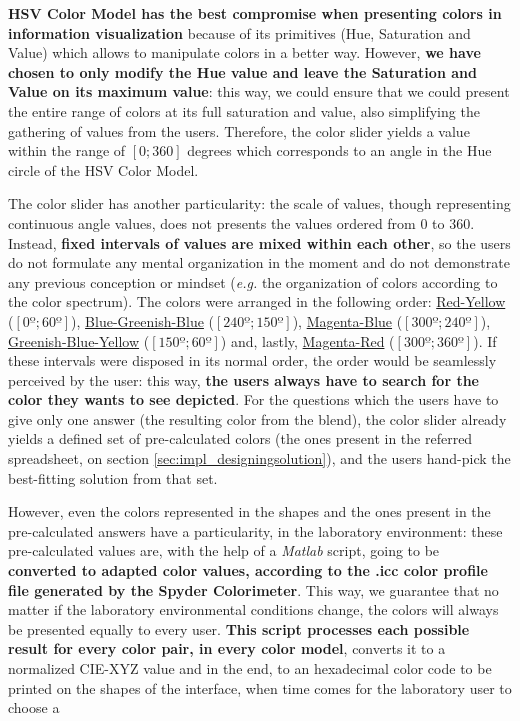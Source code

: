 \textbf{HSV Color Model has the best compromise when presenting colors in information visualization} because of its primitives (Hue, Saturation and Value)
which allows to manipulate colors in a better way. However, \textbf{we have chosen to only modify the Hue value and leave the Saturation and Value on its
maximum value}: this way, we could ensure that we could present the entire range of colors at its full saturation and value, also simplifying the gathering
of values from the users. Therefore, the color slider yields a value within the range of $[0 ; 360]$ degrees which corresponds to an angle in the Hue circle
of the HSV Color Model. \par
%
The color slider has another particularity: the scale of values, though representing continuous angle values, does not presents the values ordered from 0 to 360.
Instead, \textbf{fixed intervals of values are mixed within each other}, so the users do not formulate any mental organization in the moment and do not demonstrate any previous conception or mindset
(\emph{e.g.} the organization of colors according to the color spectrum). The colors were arranged in the following order: \ul{Red-Yellow} ($[0º; 60º]$),
\ul{Blue-Greenish-Blue} ($[240º; 150º]$), \ul{Magenta-Blue} ($[300º; 240º]$), \ul{Greenish-Blue-Yellow} ($[150º; 60º]$) and, lastly, \ul{Magenta-Red} ($[300º; 360º]$). If these
intervals were disposed in its normal order, the order would be seamlessly perceived by the user: this way, \textbf{the users always have to search for the
color they wants to see depicted}. For the questions which the users have to give only one answer (the resulting color from the blend), the color slider
already yields a defined set of pre-calculated colors (the ones present in the referred spreadsheet, on section \ref{sec:impl_designingsolution}), and the
users hand-pick the best-fitting solution from that set. \par
%
However, even the colors represented in the shapes and the ones present in the pre-calculated answers have a particularity, in the laboratory environment: these
pre-calculated values are, with the help of a \emph{Matlab} script, going to be \textbf{converted to adapted color values, according to the .icc color profile
file generated by the Spyder Colorimeter}. This way, we guarantee that no matter if the laboratory environmental conditions change, the colors will always be
presented equally to every user. \textbf{This script processes each possible result for every color pair, in every color model}, converts it to a normalized
CIE-XYZ value and in the end, to an hexadecimal color code to be printed on the shapes of the interface, when time comes for the laboratory user to choose a
